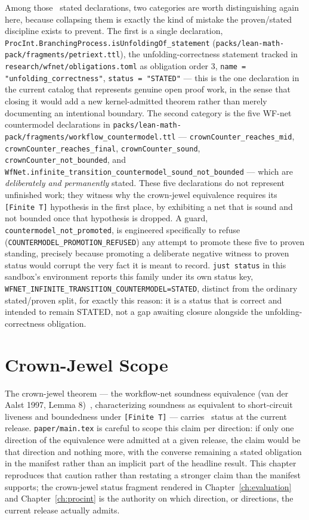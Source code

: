Among those \StatedCount\ stated declarations, two categories are worth
distinguishing again here, because collapsing them is exactly the kind of
mistake the proven/stated discipline exists to prevent. The first is a
single declaration, \texttt{ProcInt.BranchingProcess.isUnfoldingOf\_statement}
(\texttt{packs/lean-math-pack/fragments/petriext.ttl}), the unfolding-correctness
statement tracked in \texttt{research/wfnet/obligations.toml} as
obligation order 3, \texttt{name = "unfolding\_correctness"},
\texttt{status = "STATED"} --- this is the one declaration in the current
catalog that represents genuine open proof work, in the sense that
closing it would add a new kernel-admitted theorem rather than merely
documenting an intentional boundary. The second category is the five
WF-net countermodel declarations in
\texttt{packs/lean-math-pack/fragments/workflow\_countermodel.ttl} ---
\texttt{crownCounter\_reaches\_mid}, \texttt{crownCounter\_reaches\_final},
\texttt{crownCounter\_sound}, \texttt{crownCounter\_not\_bounded}, and
\texttt{WfNet.infinite\_transition\_countermodel\_sound\_not\_bounded} ---
which are \emph{deliberately and permanently} stated. These five
declarations do not represent unfinished work; they witness why the
crown-jewel equivalence requires its \texttt{[Finite~T]} hypothesis in
the first place, by exhibiting a net that is sound and not bounded once
that hypothesis is dropped. A guard, \texttt{countermodel\_not\_promoted},
is engineered specifically to refuse (\texttt{COUNTERMODEL\_PROMOTION\_REFUSED})
any attempt to promote these five to proven standing, precisely because
promoting a deliberate negative witness to proven status would corrupt
the very fact it is meant to record. \texttt{just status} in this
sandbox's environment reports this family under its own status key,
\texttt{WFNET\_INFINITE\_TRANSITION\_COUNTERMODEL=STATED}, distinct from
the ordinary stated/proven split, for exactly this reason: it is a
status that is correct and intended to remain STATED, not a gap awaiting
closure alongside the unfolding-correctness obligation.

\section{Crown-Jewel Scope}
\label{sec:disc-crown-jewel}

The crown-jewel theorem --- the workflow-net soundness equivalence
(van der Aalst 1997, Lemma 8)~\cite{vanderaalst1997}, characterizing
soundness as equivalent to short-circuit liveness and boundedness under
\texttt{[Finite~T]} --- carries \CrownJewelStatus\ status at the current
release. \texttt{paper/main.tex} is careful to scope this claim per
direction: if only one direction of the equivalence were admitted at a
given release, the claim would be that direction and nothing more, with
the converse remaining a stated obligation in the manifest rather than an
implicit part of the headline result. This chapter reproduces that
caution rather than restating a stronger claim than the manifest
supports; the crown-jewel status fragment rendered in
Chapter~\ref{ch:evaluation} and Chapter~\ref{ch:procint} is the authority
on which direction, or directions, the current release actually admits.

